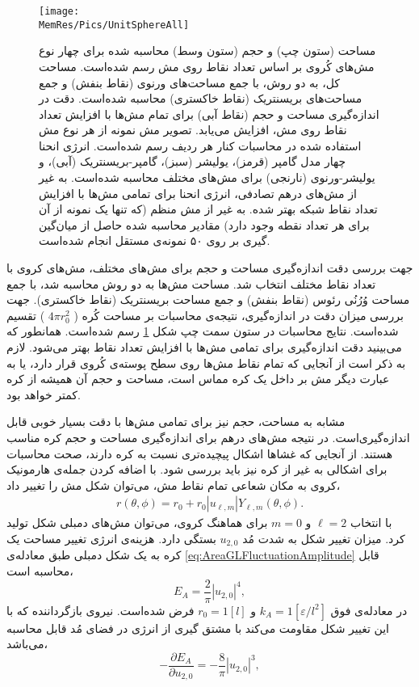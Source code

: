\begin{figure}[tbp]
\begin{center}
\texttt{[image: \\MemRes/Pics/UnitSphereAll]}
\caption{
مساحت (ستون چپ) و حجم (ستون وسط) محاسبه‌ شده برای چهار نوع مش‌های کُروی بر اساس تعداد نقاط روی مش رسم شده‌است. مساحت کل، به دو روش، با جمع مساحت‌های ورنوی (نقاط بنفش) و جمع مساحت‌های بریسنتریک (نقاط خاکستری) محاسبه شده‌است. دقت در اندازه‌گیری مساحت و حجم (نقاط آبی) برای تمام مش‌ها با افزایش تعداد نقاط روی مش، افزایش می‌یابد. تصویر مش نمونه از هر نوع مش استفاده شده در محاسبات کنار هر ردیف رسم شده‌است. انرژی انحنا چهار مدل گامپر (قرمز)، یولیشر (سبز)، گامپر-بریسنتریک (آبی)، و یولیشر-ورنوی (نارنجی) برای مش‌های مختلف محاسبه شده‌است. به غیر از مش‌های درهم تصادفی، انرژی انحنا برای تمامی مش‌ها با افزایش تعداد نقاط شبکه بهتر شده. به غیر از مش منظم (که تنها یک نمونه از آن برای هر تعداد نقطه وجود دارد) مقادیر محاسبه شده حاصل از میان‌گین گیری بر روی ۵۰ نمونه‌ی مستقل انجام شده‌است.
}
\label{fig:unitsphereAll}
\end{center}
\end{figure}

جهت بررسی دقت اندازه‌گیری مساحت و حجم برای مش‌های مختلف، مش‌های کروی با تعداد نقاط مختلف انتخاب شد.  مساحت مش‌ها به دو روش محاسبه شد، با جمع  مساحت‌ وُرُنُی رئوس (نقاط بنفش) و جمع مساحت بریسنتریک (نقاط خاکستری). جهت بررسی میزان دقت در اندازه‌گیری،  نتیجه‌ی محاسبات بر مساحت کُره (
$4\pi r_0^2$
)  تقسیم شده‌است. نتایج محاسبات در ستون سمت چپ شکل
\ref{fig:unitsphereAll}
%
رسم شده‌است. همانطور که می‌بینید دقت اندازه‌گیری برای تمامی مش‌ها با افزایش تعداد نقاط بهتر می‌شود. لازم به ذکر است  از آنجایی که تمام نقاط مش‌ها روی سطح پوسته‌ی کُروی قرار دارد، یا به عبارت دیگر مش بر داخل یک کره‌ مماس است، مساحت و حجم آن همیشه از کره کمتر خواهد بود.




مشابه به مساحت، حجم نیز برای تمامی مش‌ها با دقت بسیار خوبی قابل اندازه‌گیری‌است. در نتیجه مش‌های درهم برای اندازه‌گیری مساحت و حجم کره مناسب هستند. از آنجایی که غشا‌ها اشکال پیچیده‌تری نسبت به کره دارند، صحت محاسبات برای اشکالی به غیر از کره نیز باید بررسی شود. با اضافه کردن جمله‌ی هارمونیک کروی به مکان شعاعی تمام نقاط مش، می‌توان شکل مش را تغییر داد،
\begin{eqnarray}
r(\theta,\phi)=r_0+r_0|u_{\ell,m}|Y_{\ell,m}(\theta,\phi).
\label{eq:rDeformed}
\end{eqnarray}
با انتخاب
$\ell=2$
و
$m=0$
برای هماهنگ‌ کروی، می‌توان مش‌های دمبلی شکل  تولید کرد. میزان تغییر شکل به شدت مُد
$u_{2,0}$
بستگی دارد. هزینه‌ی انرژی تغییر مساحت یک کره به یک شکل دمبلی طبق معادله‌ی
\ref{eq:AreaGLFluctuationAmplitude}
قابل محاسبه ‌است،
\begin{equation}
E_A=\frac{2}{\pi}|u_{2,0}|^4,
\label{eq:AreaEnergyULM20}
\end{equation}
در معادله‌ی فوق 
$k_A=1[\varepsilon/l^2]$
و
$r_0=1[l]$
فرض شده‌است. نیروی بازگرداننده که با این تغییر شکل مقاومت می‌کند با مشتق گیری از انرژی در فضای مُد قابل محاسبه‌ می‌باشد، 
\begin{equation}
-\frac{\partial E_A}{\partial u_{2,0}}=-\frac{8}{\pi}|u_{2,0}|^3,
\label{eq:AreaForceULM20}
\end{equation}



